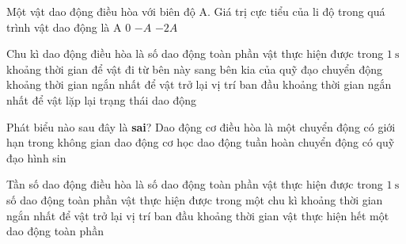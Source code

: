 \begin{ex}%
Một vật dao động điều hòa với biên độ A. Giá trị cực tiểu của li độ trong quá trình vật dao động là
\choice
{A}
{0}
{\True $-A$}
{$-2A$}
\end{ex} 
% 
\begin{ex}
Chu kì dao động điều hòa là
\choice
{số dao động toàn phần vật thực hiện được trong $1 \mathrm{~s}$}
{khoảng thời gian để vật đi từ bên này sang bên kia của quỹ đạo chuyển động}
{khoảng thời gian ngắn nhất để vật trở lại vị trí ban đầu}
{\True khoảng thời gian ngắn nhất để vật lặp lại trạng thái dao động}
\end{ex} 

\begin{ex} %
Phát biểu nào sau đây là \textbf{sai}? Dao động cơ điều hòa là một
\choice
{chuyển động có giới hạn trong không gian}
{dao động cơ học}
{dao động tuần hoàn}
{\True chuyển động có quỹ đạo hình sin}
\end{ex} 

\begin{ex}
Tần số dao động điều hòa là
\choice
{\True số dao động toàn phần vật thực hiện được trong $1 \mathrm{~s}$}
{số dao động toàn phần vật thực hiện được trong một chu kì}
{khoảng thời gian ngắn nhất để vật trở lại vị trí ban đầu}
{khoảng thời gian vật thực hiện hết một dao động toàn phần}
\end{ex} 

